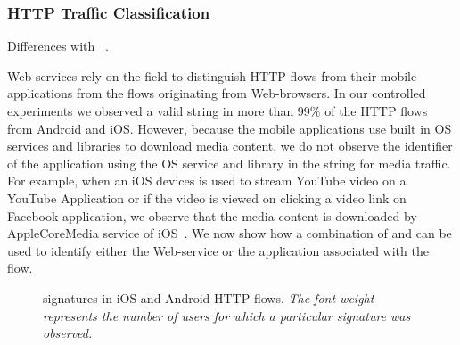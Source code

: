 \subsubsection{HTTP Traffic Classification}

Differences with ~\cite{erman2011http,xu:appusage,maier:mobtraffic}.

Web-services rely on the \useragent field to distinguish HTTP flows from their mobile applications from the flows originating from Web-browsers.
In our controlled experiments we observed a valid \useragent string in more than 99\% of the HTTP flows from Android and iOS.
However, because the mobile applications use built in OS services and libraries to download media content, we do not observe the identifier of the application using the OS service and library in the \useragent string for media traffic. 
For example, when an iOS devices is used to stream YouTube video on a YouTube Application or if the video is viewed on clicking a video link on Facebook application, we observe that the media content is downloaded by AppleCoreMedia service of iOS~\cite{apple:coremedia}. 
We now show how a combination of \useragent and \httphost can be used to identify either the Web-service or the application associated with the flow.

\begin{figure}
\newline
{}
\caption{\useragent signatures in  iOS and Android HTTP flows. \emph{The font weight represents the number of users for which a particular signature was observed.}}
\label{fig:http-wordcloud}
\end{figure}

